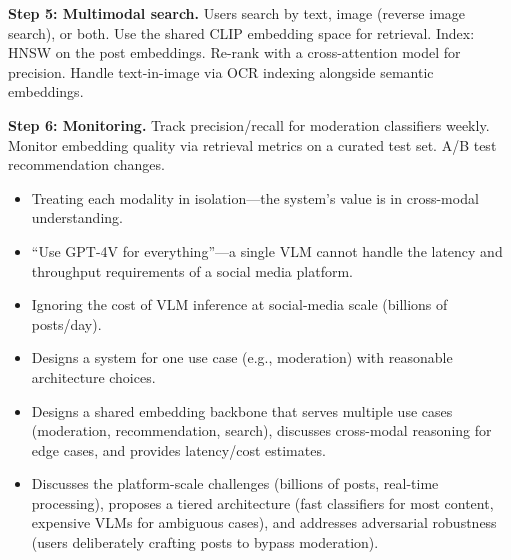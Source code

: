 \begin{interviewq}
\textbf{Step 5: Multimodal search.} Users search by text, image (reverse image search), or both. Use the shared CLIP embedding space for retrieval. Index: HNSW on the post embeddings. Re-rank with a cross-attention model for precision. Handle text-in-image via OCR indexing alongside semantic embeddings.

\textbf{Step 6: Monitoring.} Track precision/recall for moderation classifiers weekly. Monitor embedding quality via retrieval metrics on a curated test set. A/B test recommendation changes.

\redflags
\begin{itemize}
    \item Treating each modality in isolation---the system's value is in cross-modal understanding.
    \item ``Use GPT-4V for everything''---a single VLM cannot handle the latency and throughput requirements of a social media platform.
    \item Ignoring the cost of VLM inference at social-media scale (billions of posts/day).
\end{itemize}


\goodgreat
\begin{itemize}
    \item {} Designs a system for one use case (e.g., moderation) with reasonable architecture choices.
    \item {} Designs a shared embedding backbone that serves multiple use cases (moderation, recommendation, search), discusses cross-modal reasoning for edge cases, and provides latency/cost estimates.
    \item {} Discusses the platform-scale challenges (billions of posts, real-time processing), proposes a tiered architecture (fast classifiers for most content, expensive VLMs for ambiguous cases), and addresses adversarial robustness (users deliberately crafting posts to bypass moderation).
\end{itemize}

\end{interviewq}

